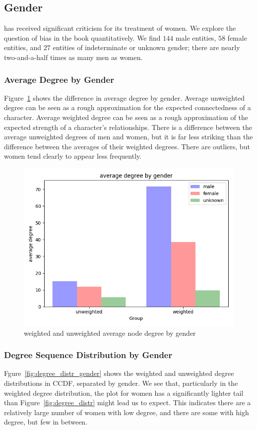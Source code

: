 \subsection{Gender}

\infinitejest has received significant criticism for its treatment of women.\cite{hayes-brady_2017} We explore the question of bias in the book quantitatively. We find $144$ male entities, $58$ female entities, and $27$ entities of indeterminate or unknown gender; there are nearly two-and-a-half times as many men as women.

\subsubsection{Average Degree by Gender}
Figure~\ref{average-node-degree-by-gender} shows the difference in average degree by gender. Average unweighted degree can be seen as a rough approximation for the expected connectedness of a character. Average weighted degree can be seen as a rough approximation of the expected strength of a character's relationships. There is a difference between the average unweighted degrees of men and women, but it is far less striking than the difference between the averages of their weighted degrees. There are outliers, but women tend clearly to appear less frequently.

\begin{figure}[ht!]
    \centering
    \includegraphics[width=.4 \textwidth]{images/gender_degrees.png}
    \caption{weighted and unweighted average node degree by gender}
    \label{average-node-degree-by-gender}
\end{figure}

\subsubsection{Degree Sequence Distribution by Gender}

Fgure~\ref{fig:degree_distr_gender} shows the weighted and unweighted degree distributions in CCDF, separated by gender. We see that, particularly in the weighted degree distribution, the plot for women has a significantly lighter tail than Figure~\ref{fig:degree_distr} might lead us to expect. This indicates there are a relatively large number of women with low degree, and there are some with high degree, but few in between.


